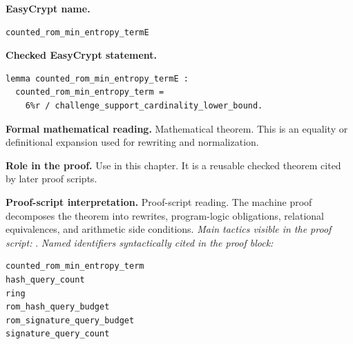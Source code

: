 \begin{formaltheorem}
\noindent\textbf{EasyCrypt name.}
\begin{lstlisting}[language=EasyCrypt,basicstyle=\ttfamily\scriptsize]
counted_rom_min_entropy_termE
\end{lstlisting}
\noindent\textbf{Checked EasyCrypt statement.}
\begin{lstlisting}[language=EasyCrypt,basicstyle=\ttfamily\scriptsize]
lemma counted_rom_min_entropy_termE :
  counted_rom_min_entropy_term =
    6%r / challenge_support_cardinality_lower_bound.
\end{lstlisting}
\noindent\textbf{Formal mathematical reading.}
Mathematical theorem. This is an equality or definitional expansion used for rewriting and normalization.

\noindent\textbf{Role in the proof.}
Use in this chapter. It is a reusable checked theorem cited by later proof scripts.

\noindent\textbf{Proof-script interpretation.}
Proof-script reading. The machine proof decomposes the theorem into rewrites, program-logic obligations, relational equivalences, and arithmetic side conditions.
\emph{Main tactics visible in the proof script:} .
\emph{Named identifiers syntactically cited in the proof block:}
\begin{lstlisting}[language=EasyCrypt,basicstyle=\ttfamily\scriptsize]
counted_rom_min_entropy_term
hash_query_count
ring
rom_hash_query_budget
rom_signature_query_budget
signature_query_count
\end{lstlisting}

\end{formaltheorem}

